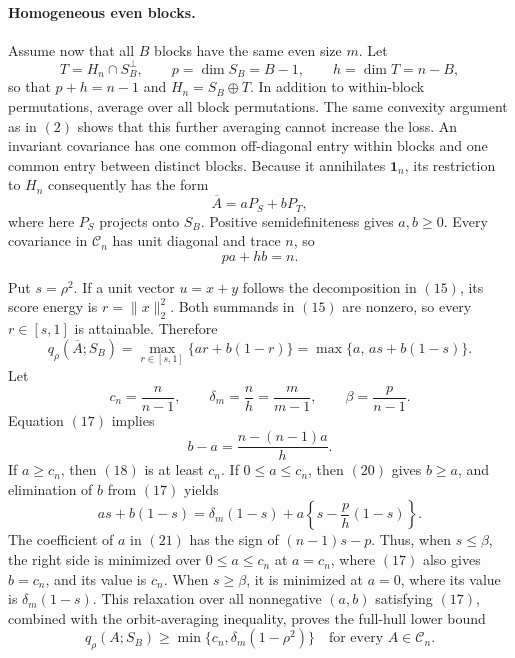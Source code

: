 \paragraph{Homogeneous even blocks.}
Assume now that all \(B\) blocks have the same even size \(m\).  Let
\[
T=H_n\cap S_B^\perp,
\qquad
p=\dim S_B=B-1,
\qquad
h=\dim T=n-B,
\tag{15}
\]
so that \(p+h=n-1\) and \(H_n=S_B\mathbin\oplus T\).  In addition to within-block permutations, average over all block permutations.  The same convexity argument as in \((2)\) shows that this further averaging cannot increase the loss.  An invariant covariance has one common off-diagonal entry within blocks and one common entry between distinct blocks.  Because it annihilates \(\mathbf1_n\), its restriction to \(H_n\) consequently has the form
\[
\overline A=aP_S+bP_T,
\tag{16}
\]
where here \(P_S\) projects onto \(S_B\).  Positive semidefiniteness gives \(a,b\geq0\).  Every covariance in \(\mathcal C_n\) has unit diagonal and trace \(n\), so
\[
pa+hb=n.
\tag{17}
\]

Put \(s=\rho^2\).  If a unit vector \(u=x+y\) follows the decomposition in \((15)\), its score energy is \(r=\|x\|_2^2\).  Both summands in \((15)\) are nonzero, so every \(r\in[s,1]\) is attainable.  Therefore
\[
q_\rho(\overline A;S_B)
=\max_{r\in[s,1]}\{ar+b(1-r)\}
=\max\{a,\,as+b(1-s)\}.
\tag{18}
\]
Let
\[
c_n=\frac{n}{n-1},
\qquad
\delta_m=\frac{n}{h}=\frac{m}{m-1},
\qquad
\beta=\frac{p}{n-1}.
\tag{19}
\]
Equation \((17)\) implies
\[
b-a=\frac{n-(n-1)a}{h}.
\tag{20}
\]
If \(a\geq c_n\), then \((18)\) is at least \(c_n\).  If \(0\leq a\leq c_n\), then \((20)\) gives \(b\geq a\), and elimination of \(b\) from \((17)\) yields
\[
as+b(1-s)
=\delta_m(1-s)
+a\left\{s-\frac{p}{h}(1-s)\right\}.
\tag{21}
\]
The coefficient of \(a\) in \((21)\) has the sign of \((n-1)s-p\).  Thus, when \(s\leq\beta\), the right side is minimized over \(0\leq a\leq c_n\) at \(a=c_n\), where \((17)\) also gives \(b=c_n\), and its value is \(c_n\).  When \(s\geq\beta\), it is minimized at \(a=0\), where its value is \(\delta_m(1-s)\).  This relaxation over all nonnegative \((a,b)\) satisfying \((17)\), combined with the orbit-averaging inequality, proves the full-hull lower bound
\[
q_\rho(A;S_B)
\geq \min\{c_n,\delta_m(1-\rho^2)\}
\quad\text{for every }A\in\mathcal C_n.
\tag{22}
\]

